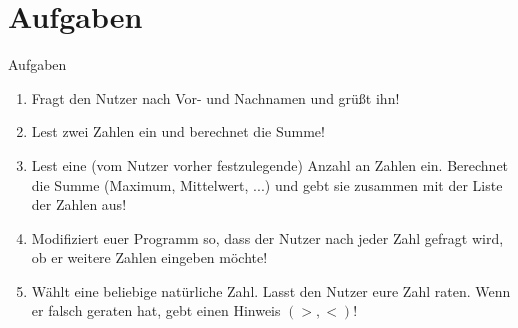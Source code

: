 \section{Aufgaben}
\begin{frame}{Aufgaben}
	\begin{enumerate}
	\item Fragt den Nutzer nach Vor- und Nachnamen und grüßt ihn!
	\item Lest zwei Zahlen ein und berechnet die Summe!
	\item Lest eine (vom Nutzer vorher festzulegende) Anzahl an Zahlen ein. Berechnet die Summe (Maximum, Mittelwert, ...) und gebt sie zusammen mit der Liste der Zahlen aus!
	\item Modifiziert euer Programm so, dass der Nutzer nach jeder Zahl gefragt wird, ob er weitere Zahlen eingeben möchte!
	\item Wählt eine beliebige natürliche Zahl. Lasst den Nutzer eure Zahl raten. Wenn er falsch geraten hat, gebt einen Hinweis $(>, <)$!
	\end{enumerate}
\end{frame}


